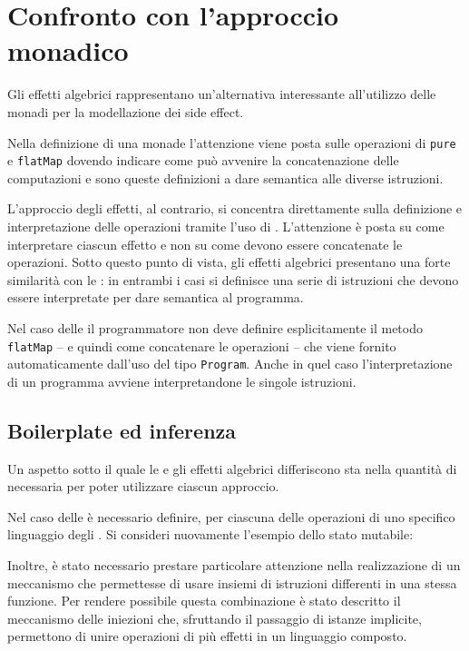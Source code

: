 \section{Confronto con l'approccio monadico}
Gli effetti algebrici rappresentano un'alternativa interessante all'utilizzo delle monadi per la modellazione dei side effect.

Nella definizione di una monade l'attenzione viene posta sulle operazioni di \lstinline{pure} e \lstinline{flatMap} dovendo indicare come può avvenire la concatenazione delle computazioni e sono queste definizioni a dare semantica alle diverse istruzioni.

L'approccio degli effetti, al contrario, si concentra direttamente sulla definizione e interpretazione delle operazioni tramite l'uso di . L'attenzione è posta su come interpretare ciascun effetto e non su come devono essere concatenate le operazioni.
Sotto questo punto di vista, gli effetti algebrici presentano una forte similarità con le : in entrambi i casi si definisce una serie di istruzioni che devono essere interpretate per dare semantica al programma.

Nel caso delle  il programmatore non deve definire esplicitamente il metodo \lstinline{flatMap} -- e quindi come concatenare le operazioni -- che viene fornito automaticamente dall'uso del tipo \lstinline{Program}.
Anche in quel caso l'interpretazione di un programma avviene interpretandone le singole istruzioni.

\subsection{Boilerplate ed inferenza}
Un aspetto sotto il quale le  e gli effetti algebrici differiscono sta nella quantità di  necessaria per poter utilizzare ciascun approccio.

Nel caso delle  è necessario definire, per ciascuna delle operazioni di uno specifico linguaggio degli . Si consideri nuovamente l'esempio dello stato mutabile:

Inoltre, è stato necessario prestare particolare attenzione nella realizzazione di un meccanismo che permettesse di usare insiemi di istruzioni differenti in una stessa funzione.
Per rendere possibile questa combinazione è stato descritto il meccanismo delle iniezioni che, sfruttando il passaggio di istanze implicite, permettono di unire operazioni di più effetti in un linguaggio composto.

